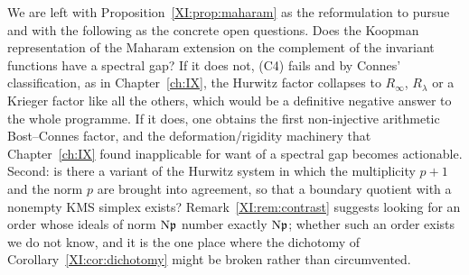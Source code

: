 We are left with Proposition~\ref{XI:prop:maharam} as the reformulation to pursue and with the
following as the concrete open questions. Does the Koopman representation of the Maharam
extension on the complement of the invariant functions have a spectral gap? If it does not,
(C4) fails and by Connes' classification, as in Chapter~\ref{ch:IX}, the Hurwitz factor collapses to
$R_\infty$, $R_\lambda$ or a Krieger factor like all the others, which would be a definitive
negative answer to the whole programme. If it does, one obtains the first non-injective
arithmetic Bost--Connes factor, and the deformation/rigidity machinery that Chapter~\ref{ch:IX} found
inapplicable for want of a spectral gap becomes actionable. Second: is there a variant of the Hurwitz
system in which the multiplicity $p+1$ and the norm $p$ are brought into agreement, so that a
boundary quotient with a nonempty KMS simplex exists? Remark~\ref{XI:rem:contrast} suggests
looking for an order whose ideals of norm $\mathrm{N}\mathfrak{p}$ number exactly $\mathrm{N}\mathfrak{p}$; whether such an
order exists we do not know, and it is the one place where the dichotomy of
Corollary~\ref{XI:cor:dichotomy} might be broken rather than circumvented.

